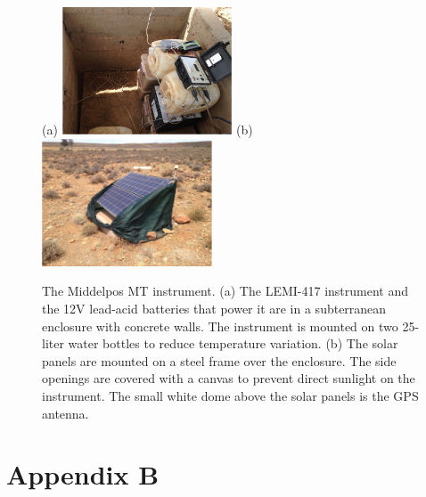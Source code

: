 \documentclass[draft,linenumbers]{agujournal2018}
\begin{document}
\begin{figure}[h]
  \centering
  (a)
  \includegraphics[width=0.45\textwidth]{figures/instrument.pdf}
  (b)
  \includegraphics[width=0.45\textwidth]{figures/solarpanel.pdf}
  \caption{The Middelpos MT instrument. (a) The LEMI-417 instrument and the 12V lead-acid batteries that power it are in a subterranean enclosure with concrete walls. The instrument is mounted on two 25-liter water bottles to reduce temperature variation. (b) The solar panels are mounted on a steel frame over the enclosure. The side openings are covered with a canvas to prevent direct sunlight on the instrument. The small white dome above the solar panels is the GPS antenna.}
  \label{fig:lemi}
\end{figure}

\section{Appendix B}
\end{document}
